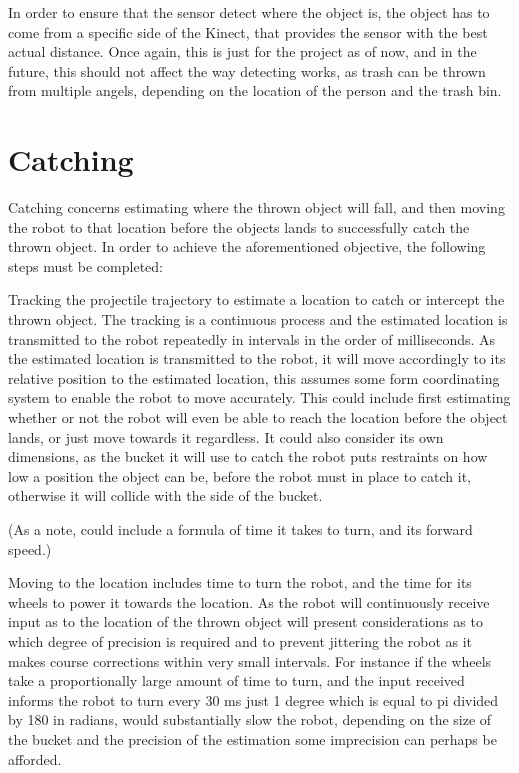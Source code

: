 In order to ensure that the sensor detect where the object is, the object has to come from a specific side of the Kinect, that provides the sensor with the best actual distance. Once again, this is just for the project as of now, and in the future, this should not affect the way detecting works, as trash can be thrown from multiple angels, depending on the location of the person and the trash bin.


\section{Catching}
\label{sec:catchingTheory}
Catching concerns estimating where the thrown object will fall, and then moving the robot to that location before the objects lands to successfully catch the thrown object. In order to achieve the aforementioned objective, the following steps must be completed:

Tracking the projectile trajectory to estimate a location to catch or intercept the thrown object. The tracking is a continuous process and the estimated location is transmitted to the robot repeatedly in intervals in the order of milliseconds. As the estimated location is transmitted to the robot, it will move accordingly to its relative position to the estimated location, this assumes some form coordinating system to enable the robot to move accurately. This could include first estimating whether or not the robot will even be able to reach the location before the object lands, or just move towards it regardless. It could also consider its own dimensions, as the bucket it will use to catch the robot puts restraints on how low a position the object can be, before the robot must in place to catch it, otherwise it will collide with the side of the bucket. 

(As a note, could include a formula of time it takes to turn, and its forward speed.)

Moving to the location includes time to turn the robot, and the time for its wheels to power it towards the location. As the robot will continuously receive input as to the location of the thrown object will present considerations as to which degree of precision is required and to prevent jittering the robot as it makes course corrections within very small intervals. For instance if the wheels take a proportionally large amount of time to turn, and the input received informs the robot to turn every 30 ms just 1 degree which is equal to pi divided by 180 in radians, would substantially slow the robot, depending on the size of the bucket and the precision of the estimation some imprecision can perhaps be afforded. 

